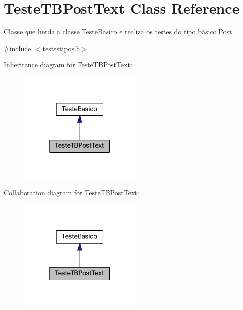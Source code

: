 \hypertarget{class_teste_t_b_post_text}{\section{Teste\-T\-B\-Post\-Text Class Reference}
\label{class_teste_t_b_post_text}
}


Classe que herda a classe \hyperlink{class_teste_basico}{Teste\-Basico} e realiza os testes do tipo básico \hyperlink{class_post}{Post}.  




{\ttfamily \#include $<$testestipos.\-h$>$}



Inheritance diagram for Teste\-T\-B\-Post\-Text\-:\nopagebreak
\begin{figure}[H]
\begin{center}
\leavevmode
\includegraphics[width=172pt]{class_teste_t_b_post_text__inherit__graph}
\end{center}
\end{figure}


Collaboration diagram for Teste\-T\-B\-Post\-Text\-:\nopagebreak
\begin{figure}[H]
\begin{center}
\leavevmode
\includegraphics[width=172pt]{class_teste_t_b_post_text__coll__graph}
\end{center}
\end{figure}
